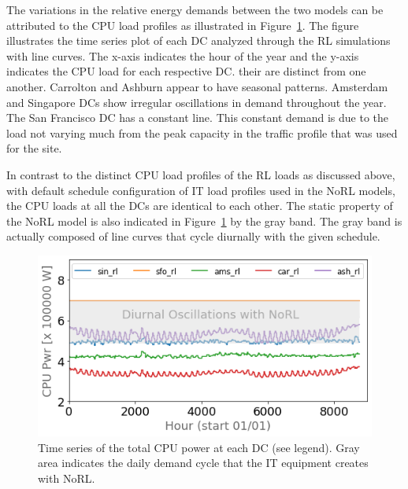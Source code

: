The variations in the relative energy demands between the two models can be attributed to the CPU load profiles as illustrated in Figure~\ref{fig:cpu_comps}. The figure illustrates the time series plot of each DC analyzed through the RL simulations with line curves. The x-axis indicates the hour of the year and the y-axis indicates the CPU load for each respective DC.  their  are distinct from one another. Carrolton and Ashburn appear to have   seasonal patterns. Amsterdam and Singapore DCs show irregular oscillations in demand throughout the year. The San Francisco DC has a constant line. This constant demand is due to the load not varying much from the peak capacity in the traffic profile that was used for the site. 

In contrast to the distinct CPU load profiles of the RL loads as discussed above, with default schedule configuration of IT load profiles used in the NoRL models, the CPU loads at all the DCs are identical to each other. The static property of the NoRL model is also indicated in Figure~\ref{fig:cpu_comps} by the gray band. The gray band is actually composed of line curves that cycle diurnally with the given schedule.


\begin{figure}
  \centering
  \includegraphics[scale=0.45]{building_energy_model/img/cpu_comps.png}
  \caption[CPU Time Series]{Time series of the total CPU power at each DC (see legend). Gray area indicates the daily demand cycle that the IT equipment creates with NoRL.}
  \label{fig:cpu_comps}
  \end{figure}


